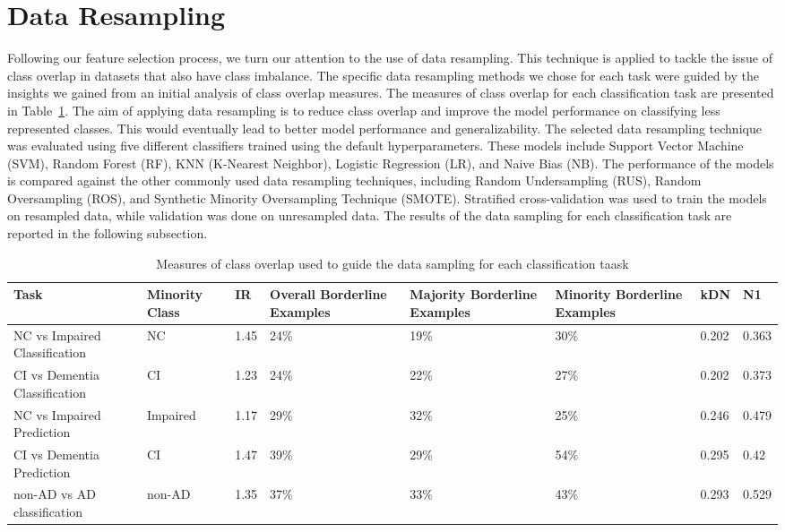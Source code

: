 \section{Data Resampling}
Following our feature selection process, we turn our attention to the use of data resampling. This technique is applied to tackle the issue of class overlap in datasets that also have class imbalance. The specific data resampling methods we chose for each task were guided by the insights we gained from an initial analysis of class overlap measures. The measures of class overlap for each classification task are presented in Table~\ref{table:class-overlap-berfore-data-sampling}. The aim of applying data resampling is to reduce class overlap and improve the model performance on classifying less represented classes. This would eventually lead to better model performance and generalizability. The selected data resampling technique was evaluated using five different classifiers trained using the default hyperparameters. These models include Support Vector Machine (\acrshort{SVM}), Random Forest (\acrshort{RF}), KNN (K-Nearest Neighbor), Logistic Regression (\acrshort{LR}), and Naive Bias (NB). The performance of the models is compared against the other commonly used data resampling techniques, including Random Undersampling (RUS), Random Oversampling (ROS), and Synthetic Minority Oversampling Technique (SMOTE). Stratified cross-validation was used to train the models on resampled data, while validation was done on unresampled data. The results of the data sampling for each classification task are reported in the following subsection.

\begin{table}[!ht]
    \centering
    \caption{Measures of class overlap used to guide the data sampling for each classification taask}
    \begin{tabular}{|p{2cm}|p{2cm}|l|p{2cm}|p{2cm}|p{2cm}|l|l|}
    \hline
        Task & Minority Class & IR & Overall Borderline Examples & Majority Borderline Examples & Minority Borderline Examples & kDN & N1 \\ \hline
        NC vs Impaired Classification & NC & 1.45 & 24\% & 19\% & 30\% & 0.202 & 0.363 \\ \hline
        CI vs Dementia Classification & CI & 1.23 & 24\% & 22\% & 27\% & 0.202 & 0.373 \\ \hline
        NC vs Impaired Prediction & Impaired & 1.17 & 29\% & 32\% & 25\% & 0.246 & 0.479 \\ \hline
        CI vs Dementia Prediction & CI & 1.47 & 39\% & 29\% & 54\% & 0.295 & 0.42 \\ \hline
        non-AD vs AD classification & non-AD & 1.35 & 37\% & 33\% & 43\% & 0.293 & 0.529 \\ \hline
    \end{tabular}
    \label{table:class-overlap-berfore-data-sampling}
\end{table}

